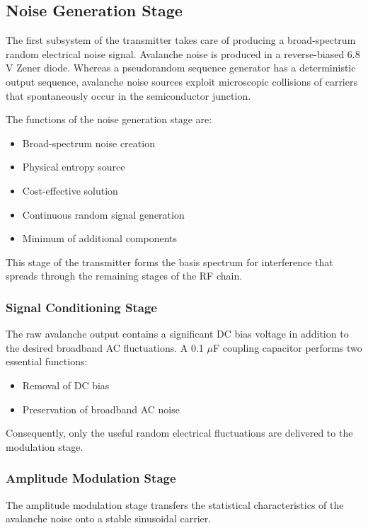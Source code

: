 \documentclass[12pt,a4paper]{report}
\begin{document}
	\subsection*{Noise Generation Stage}
	
	The first subsystem of the transmitter takes care of producing a broad-spectrum random electrical noise signal. Avalanche noise is produced in a reverse-biased 6.8 V Zener diode. Whereas a pseudorandom sequence generator has a deterministic output sequence, avalanche noise sources exploit microscopic collisions of carriers that spontaneously occur in the semiconductor junction.
	
	The functions of the noise generation stage are:
	\begin{itemize}
		\item Broad-spectrum noise creation
		\item Physical entropy source
		\item Cost-effective solution
		\item Continuous random signal generation
		\item Minimum of additional components
	\end{itemize}
	
	This stage of the transmitter forms the basis spectrum for interference that spreads through the remaining stages of the RF chain.
	\subsubsection{Signal Conditioning Stage}
	
	The raw avalanche output contains a significant DC bias voltage in addition to the desired broadband AC fluctuations. A 0.1 $\mu$F coupling capacitor performs two essential functions:
	\begin{itemize}
		\item Removal of DC bias
		\item Preservation of broadband AC noise
	\end{itemize}
	Consequently, only the useful random electrical fluctuations are delivered to the modulation stage.
	
	\subsubsection{Amplitude Modulation Stage}
	
	The amplitude modulation stage transfers the statistical characteristics of the avalanche noise onto a stable sinusoidal carrier.
	
\end{document}
